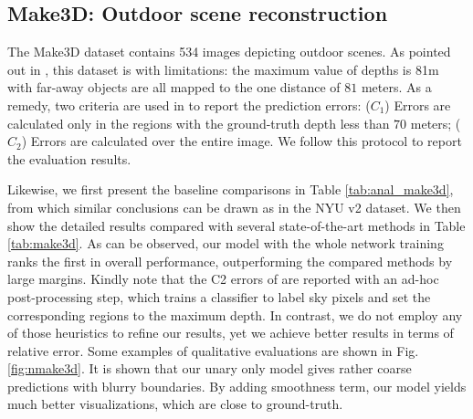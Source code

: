 %
%
%
%








%
%
%
%
%
%
%
%
%
%
%
%
%
%
%
%
%
%
%
%
%
%
%
%
%
%
%



























\subsection{Make3D: Outdoor scene reconstruction}
The Make3D dataset contains 534 images depicting outdoor scenes.
%
As pointed out in \cite{make3d_pami09,Miaomiao_cvpr14}, this dataset is with limitations: the maximum value of depths is 81m with far-away objects are all mapped to the one distance of $81$ meters. 
As a remedy, two criteria are used in \cite{Miaomiao_cvpr14} to report the prediction errors: ($C_1$) Errors are calculated only in the regions with the ground-truth depth less than $70$ meters; ($C_2$) Errors are calculated over the entire image.
We follow this protocol to report the evaluation results. 

Likewise, we first present the baseline comparisons in Table \ref{tab:anal_make3d}, from which similar conclusions can be drawn as in the NYU v2 dataset. 
We then show the detailed results compared with several state-of-the-art methods in Table \ref{tab:make3d}.  
As can be observed, our model with 
the whole network training
ranks the first in overall performance,
outperforming the compared methods by large margins.
Kindly note that the C2 errors of \cite{Miaomiao_cvpr14} are reported with an ad-hoc post-processing step, which trains a classifier to label sky pixels and set the corresponding regions to the maximum depth.
In contrast, we do not employ any of those heuristics to refine our results, yet we achieve better results in terms of relative error. %
%
Some examples of qualitative  evaluations are shown in Fig. \ref{fig:nmake3d}.  
%
It is shown that our unary only model gives rather coarse predictions with blurry boundaries. 
By adding smoothness term, our model yields much better visualizations, which are close to ground-truth.













